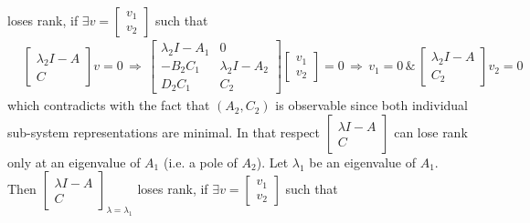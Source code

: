 \documentclass[twoside]{article}
\begin{document}
loses rank, if $\exists v = \begin{bmatrix} v_1 \\ v_2 \end{bmatrix}$ such that 
%
\begin{align*}
	&\left[ \begin{array}{c} \lambda_2 I - A \\ \hline C \end{array} \right] v = 0
	\, \Rightarrow \, 
	\left[ \begin{array}{c|c} \lambda_2 I - A_1 & 0 \\ \hline -B_2 C_1 &  \lambda_2 I - A_2 \\ \hline 
	D_2 C_1 & C_2
	\end{array} \right]  \begin{bmatrix} v_1 \\ v_2 \end{bmatrix} = 0
		\, \Rightarrow \, v_1 = 0 \, \& \, \left[ \begin{array}{c} \lambda_2 I - A \\ \hline C_2 \end{array} \right] v_2 = 0
\end{align*}
%
which contradicts with the fact that $(A_2,C_2)$ is observable since both individual sub-system representations are minimal. 
In that respect $\left[ \begin{array}{c} \lambda I - A \\ \hline C \end{array} \right]$ can lose rank only at an eigenvalue
of $A_1$ (i.e. a pole of $A_2$). Let $\lambda_1$ be an eigenvalue of $A_1$.
Then $\left[ \begin{array}{c} \lambda I - A \\ \hline C \end{array} \right]_{\lambda = \lambda_1}$ 
loses rank, if $\exists v = \begin{bmatrix} v_1 \\ v_2 \end{bmatrix}$ such that 
%
\end{document}
